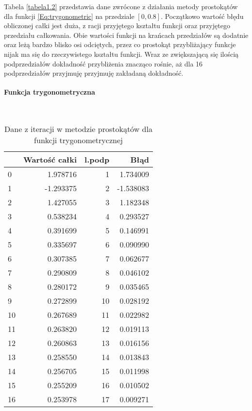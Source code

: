 \documentclass[12pt,twoside]{article}
\begin{document}
Tabela \eqref{tabela1.2} przedstawia dane zwrócone z działania metody prostokątów dla funkcji \eqref{Eq:trygonometric} na przedziale $[0,0.8]$.
Początkowo wartość błędu obliczonej całki jest duża, z racji przyjętego kształtu funkcji oraz przyjętego przedziału całkowania. Obie wartości funkcji na krańcach przedziałów są dodatnie oraz leżą bardzo blisko osi odciętych, przez co prostokąt przybliżający funkcje nijak ma się do rzeczywistego kształtu funkcji. Wraz ze zwiększającą się ilością podprzedziałów dokładność przybliżenia znacząco rośnie, aż dla 16 podprzedziałów przyjmuję przyjmuję zakładaną dokładność.


\paragraph{Funkcja trygonometryczna}\mbox{} \\

\begin{table}[H]
\centering 
\caption{Dane z iteracji w metodzie prostokątów dla funkcji trygonometrycznej}
\label{tabela1.2}
\begin{tabular}{lrrr}
\toprule
{} &  Wartość całki &  l.podp &      Błąd \\
\midrule
0  &       1.978716 &       1 &  1.734009 \\
1  &      -1.293375 &       2 & -1.538083 \\
2  &       1.427055 &       3 &  1.182348 \\
3  &       0.538234 &       4 &  0.293527 \\
4  &       0.391699 &       5 &  0.146991 \\
5  &       0.335697 &       6 &  0.090990 \\
6  &       0.307385 &       7 &  0.062677 \\
7  &       0.290809 &       8 &  0.046102 \\
8  &       0.280172 &       9 &  0.035465 \\
9  &       0.272899 &      10 &  0.028192 \\
10 &       0.267689 &      11 &  0.022982 \\
11 &       0.263820 &      12 &  0.019113 \\
12 &       0.260863 &      13 &  0.016156 \\
13 &       0.258550 &      14 &  0.013843 \\
14 &       0.256705 &      15 &  0.011998 \\
15 &       0.255209 &      16 &  0.010502 \\
16 &       0.253978 &      17 &  0.009271 \\
\bottomrule
\end{tabular}
\end{table}
\end{document}
